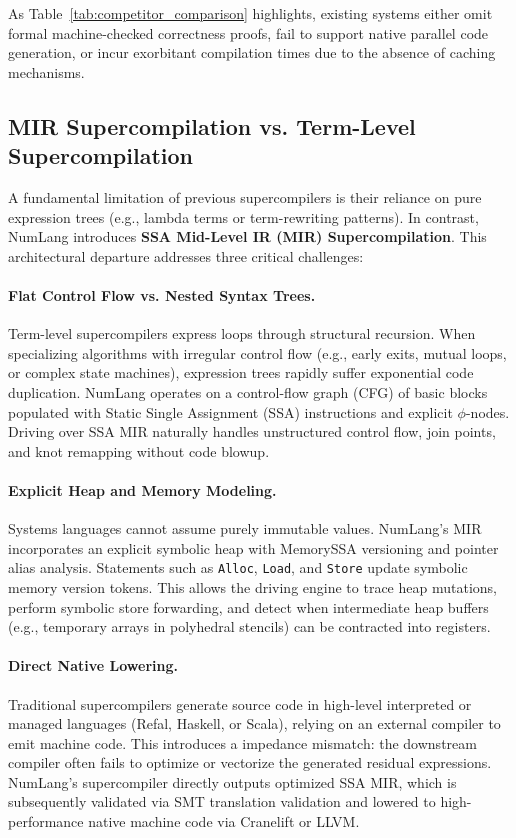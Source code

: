 As Table~\ref{tab:competitor_comparison} highlights, existing systems either omit formal machine-checked correctness proofs, fail to support native parallel code generation, or incur exorbitant compilation times due to the absence of caching mechanisms.

\subsection{MIR Supercompilation vs. Term-Level Supercompilation}
A fundamental limitation of previous supercompilers is their reliance on pure expression trees (e.g., lambda terms or term-rewriting patterns). In contrast, NumLang introduces \textbf{SSA Mid-Level IR (MIR) Supercompilation}. This architectural departure addresses three critical challenges:

\paragraph{Flat Control Flow vs. Nested Syntax Trees.}
Term-level supercompilers express loops through structural recursion. When specializing algorithms with irregular control flow (e.g., early exits, mutual loops, or complex state machines), expression trees rapidly suffer exponential code duplication. NumLang operates on a control-flow graph (CFG) of basic blocks populated with Static Single Assignment (SSA) instructions and explicit $\phi$-nodes. Driving over SSA MIR naturally handles unstructured control flow, join points, and knot remapping without code blowup.

\paragraph{Explicit Heap and Memory Modeling.}
Systems languages cannot assume purely immutable values. NumLang's MIR incorporates an explicit symbolic heap with MemorySSA versioning and pointer alias analysis. Statements such as \texttt{Alloc}, \texttt{Load}, and \texttt{Store} update symbolic memory version tokens. This allows the driving engine to trace heap mutations, perform symbolic store forwarding, and detect when intermediate heap buffers (e.g., temporary arrays in polyhedral stencils) can be contracted into registers.

\paragraph{Direct Native Lowering.}
Traditional supercompilers generate source code in high-level interpreted or managed languages (Refal, Haskell, or Scala), relying on an external compiler to emit machine code. This introduces a impedance mismatch: the downstream compiler often fails to optimize or vectorize the generated residual expressions. NumLang's supercompiler directly outputs optimized SSA MIR, which is subsequently validated via SMT translation validation and lowered to high-performance native machine code via Cranelift or LLVM.
